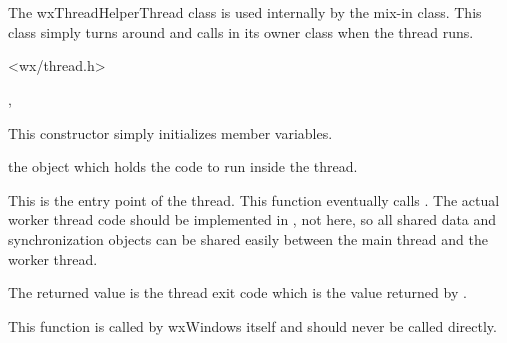 \section{}\label{wxThreadHelperThread}

The wxThreadHelperThread class is used internally by the
 mix-in class.  This class simply
turns around and calls 
in its owner class when the thread runs.




<wx/thread.h>


, 


\label{wxthreadctor}


This constructor simply initializes member variables.



the  object which holds the code to
run inside the thread.

\label{wxthreadhelperthreadentry}


This is the entry point of the thread.  This function eventually calls
.  The actual worker
thread code should be implemented in
, not here, so all
shared data and synchronization objects can be shared easily between the
main thread and the worker thread.

The returned value is the thread exit code which is the value returned by
.

This function is called by wxWindows itself and should never be called
directly.

\label{wxthreadhelperthreadcallentry}

